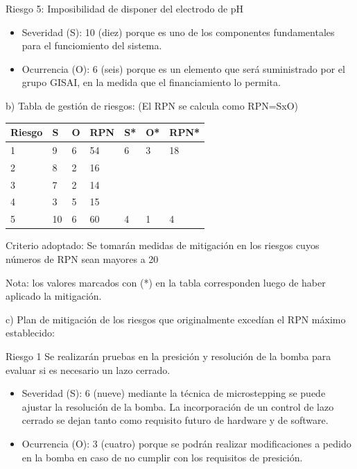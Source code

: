 \documentclass[11pt]{charter}
\begin{document}
Riesgo 5: Imposibilidad de disponer del electrodo de pH
\begin{itemize}
\item Severidad (S): 10 (diez) porque es uno de los componentes fundamentales para el funciomiento del sistema.
\item Ocurrencia (O): 6 (seis) porque es un elemento que será suministrado por el grupo GISAI, en la medida que el financiamiento lo permita.
\end{itemize}


b) Tabla de gestión de riesgos:      (El RPN se calcula como RPN=SxO)

\begin{table}[htpb]
\centering
\begin{tabularx}{\linewidth}{@{}|X|X|X|X|X|X|X|@{}}
\hline
\rowcolor[HTML]{C0C0C0} 
Riesgo & S  & O  & RPN & S* & O* & RPN* \\ \hline
1      & 9  & 6  & 54  & 6  & 3  & 18     \\ \hline
2      & 8  & 2  & 16  &    &    &      \\ \hline
3      & 7  & 2  & 14  &    &    &      \\ \hline
4      & 3  & 5  & 15  &    &    &      \\ \hline
5      & 10 & 6  & 60  & 4  & 1  & 4      \\ \hline
\end{tabularx}%
\end{table}

Criterio adoptado: 
Se tomarán medidas de mitigación en los riesgos cuyos números de RPN sean mayores a 20

Nota: los valores marcados con (*) en la tabla corresponden luego de haber aplicado la mitigación.

c) Plan de mitigación de los riesgos que originalmente excedían el RPN máximo establecido:
 
Riesgo 1 Se realizarán pruebas en la presición y resolución de la bomba para evaluar si es necesario un lazo cerrado.
\begin{itemize}
\item Severidad (S): 6 (nueve) mediante la técnica de microstepping se puede ajustar la resolución de la bomba. La incorporación de un control de lazo cerrado se dejan tanto como requisito futuro de hardware y de software.
\item Ocurrencia (O): 3 (cuatro) porque se podrán realizar modificaciones a pedido en la bomba en caso de no cumplir con los requisitos de presición.
\end{itemize} 
\end{document}
